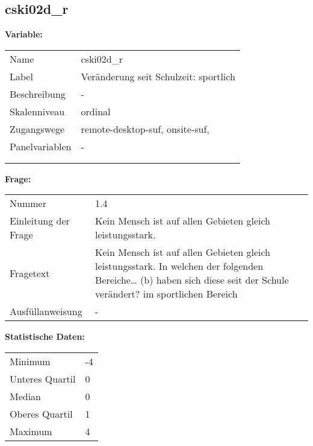 	
	
	\subsection{cski02d\_r}
	\label{subSection:cski02d_r}

	\noindent\textbf{Variable:}\\
		\begin{tabular}{lL{11.3cm}}
			\label{tableVariable:cski02d_r}
			Name & cski02d\_r \\
			Label & Veränderung seit Schulzeit: sportlich \\
			Beschreibung & - \\
			Skalenniveau & ordinal \\
			Zugangswege &
				remote-desktop-suf,
				onsite-suf,
 \\
			Panelvariablen & -
			 \\
			 \\
 \\
		\end{tabular}

		\vspace*{1 cm}
		\noindent\textbf{Frage:}\\
		\begin{tabular}{lL{11.3cm}}
			\label{tableQuestion:cski02d_r}
			Nummer & 1.4 \\
			Einleitung der Frage & Kein Mensch ist auf allen Gebieten gleich leistungsstark. \\
			Fragetext & Kein Mensch ist auf allen Gebieten gleich leistungsstark. In welchen der folgenden Bereiche…
(b) haben sich diese seit der Schule verändert?
im sportlichen Bereich \\
			Ausfüllanweisung & - \\
		\end{tabular}


		\vspace*{1 cm}
		\noindent\textbf{Statistische Daten:}\\
			\begin{tabular}{ll}
				\label{tableStatistics:cski02d_r}
					Minimum & -4 \\
					Unteres Quartil & 0 \\
					Median & 0 \\
					Oberes Quartil & 1 \\
					Maximum & 4 \\
			\end{tabular}




